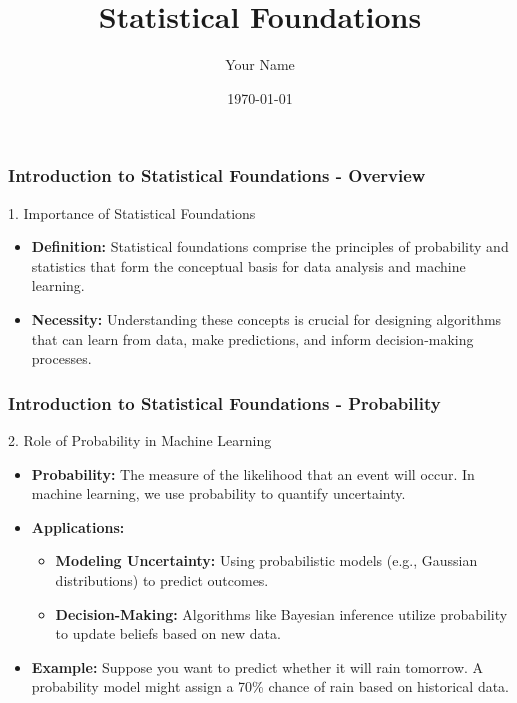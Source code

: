 \documentclass{beamer}
\title{Statistical Foundations}
\author{Your Name}
\institute{Your Institution}
\date{\today}
\begin{document}
\frame{\titlepage}

\begin{frame}[fragile]
    \titlepage
\end{frame}

\begin{frame}[fragile]
    \frametitle{Introduction to Statistical Foundations - Overview}
    \begin{block}{1. Importance of Statistical Foundations}
        \begin{itemize}
            \item \textbf{Definition:} Statistical foundations comprise the principles of probability and statistics that form the conceptual basis for data analysis and machine learning.
            \item \textbf{Necessity:} Understanding these concepts is crucial for designing algorithms that can learn from data, make predictions, and inform decision-making processes.
        \end{itemize}
    \end{block}
\end{frame}

\begin{frame}[fragile]
    \frametitle{Introduction to Statistical Foundations - Probability}
    \begin{block}{2. Role of Probability in Machine Learning}
        \begin{itemize}
            \item \textbf{Probability:} The measure of the likelihood that an event will occur. In machine learning, we use probability to quantify uncertainty.
            \item \textbf{Applications:}
            \begin{itemize}
                \item \textbf{Modeling Uncertainty:} Using probabilistic models (e.g., Gaussian distributions) to predict outcomes.
                \item \textbf{Decision-Making:} Algorithms like Bayesian inference utilize probability to update beliefs based on new data.
            \end{itemize}
            \item \textbf{Example:} Suppose you want to predict whether it will rain tomorrow. A probability model might assign a 70\% chance of rain based on historical data.
        \end{itemize}
    \end{block}
\end{frame}
\end{document}

